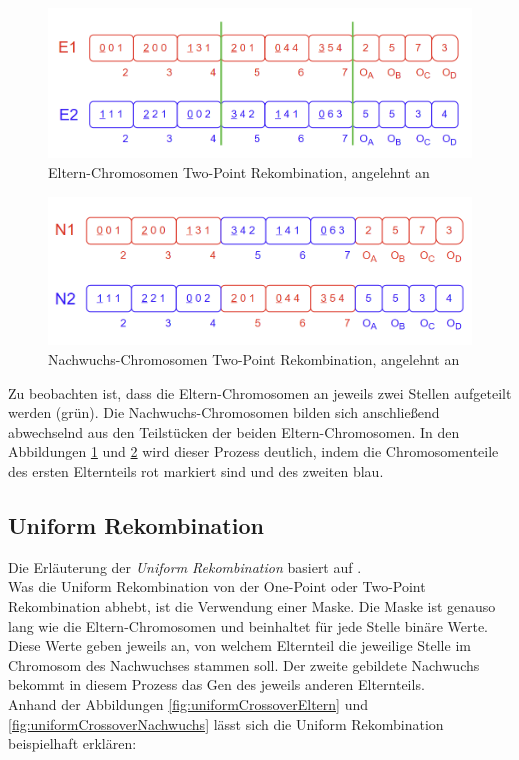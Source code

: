 \begin{figure}[H]
    \centering
    \includegraphics[scale = 0.5]{Bilder/BeispielTwoPointCrossover.png}
    \caption{Eltern-Chromosomen Two-Point Rekombination, angelehnt an \cite{torabi_using_2022}}
    \label{fig:twoPointCrossoverEltern}
\end{figure}
\begin{figure}[H]
    \centering
    \includegraphics[scale = 0.5]{Bilder/BeispielTwoPointCrossover2.png}
    \caption{Nachwuchs-Chromosomen Two-Point Rekombination, angelehnt an \cite{torabi_using_2022}}
    \label{fig:twoPointCrossoverNachwuchs}
\end{figure}

Zu beobachten ist, dass die Eltern-Chromosomen an jeweils zwei Stellen aufgeteilt werden (grün).
Die Nachwuchs-Chromosomen bilden sich anschließend abwechselnd aus den Teilstücken der beiden Eltern-Chromosomen.
In den Abbildungen \ref{fig:twoPointCrossoverEltern} und \ref{fig:twoPointCrossoverNachwuchs} wird dieser Prozess deutlich, indem die Chromosomenteile des ersten Elternteils rot markiert sind und des zweiten blau.


\subsection{Uniform Rekombination}
\label{subsubsec:unformCrossover}
Die Erläuterung der \emph{Uniform Rekombination} basiert auf \cite{syswerda_uniform_1989}.\\
Was die Uniform Rekombination von der One-Point oder Two-Point Rekombination abhebt, ist die Verwendung einer Maske. 
Die Maske ist genauso lang wie die Eltern-Chromosomen und beinhaltet für jede Stelle binäre Werte.
Diese Werte geben jeweils an, von welchem Elternteil die jeweilige Stelle im Chromosom des Nachwuchses stammen soll.
Der zweite gebildete Nachwuchs bekommt in diesem Prozess das Gen des jeweils anderen Elternteils.\\
Anhand der Abbildungen \ref{fig:uniformCrossoverEltern} und \ref{fig:uniformCrossoverNachwuchs} lässt sich die Uniform Rekombination beispielhaft erklären:

